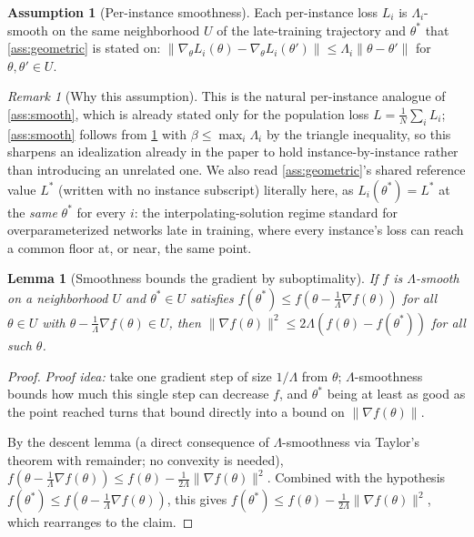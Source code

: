 \documentclass{article}
\theoremstyle{plain}
\newtheorem{lemma}[theorem]{Lemma}
\theoremstyle{definition}
\newtheorem{assumption}[theorem]{Assumption}
\theoremstyle{remark}
\newtheorem{remark}[theorem]{Remark}
\begin{document}
\begin{assumption}[Per-instance smoothness]
\label{ass:smoothi}
Each per-instance loss $L_i$ is $\Lambda_i$-smooth on the same neighborhood $U$ of the late-training trajectory and $\theta^*$ that \cref{ass:geometric} is stated on: $\|\nabla_\theta L_i(\theta)-\nabla_\theta L_i(\theta')\|\le\Lambda_i\|\theta-\theta'\|$ for $\theta,\theta'\in U$.
\end{assumption}

\begin{remark}[Why this assumption]
\label{rem:smoothi-why}
This is the natural per-instance analogue of \cref{ass:smooth}, which is already stated only for the population loss $L=\frac1N\sum_i L_i$; \cref{ass:smooth} follows from \cref{ass:smoothi} with $\beta\le\max_i\Lambda_i$ by the triangle inequality, so this sharpens an idealization already in the paper to hold instance-by-instance rather than introducing an unrelated one. We also read \cref{ass:geometric}'s shared reference value $L^*$ (written with no instance subscript) literally here, as $L_i(\theta^*)=L^*$ at the \emph{same} $\theta^*$ for every $i$: the interpolating-solution regime standard for overparameterized networks late in training, where every instance's loss can reach a common floor at, or near, the same point.
\end{remark}

\begin{lemma}[Smoothness bounds the gradient by suboptimality]
\label{lem:descent}
If $f$ is $\Lambda$-smooth on a neighborhood $U$ and $\theta^*\in U$ satisfies $f(\theta^*)\le f(\theta-\tfrac1\Lambda\nabla f(\theta))$ for all $\theta\in U$ with $\theta-\tfrac1\Lambda\nabla f(\theta)\in U$, then $\|\nabla f(\theta)\|^2 \le 2\Lambda(f(\theta)-f(\theta^*))$ for all such $\theta$.
\end{lemma}
\begin{proof}
\emph{Proof idea:} take one gradient step of size $1/\Lambda$ from $\theta$; $\Lambda$-smoothness bounds how much this single step can decrease $f$, and $\theta^*$ being at least as good as the point reached turns that bound directly into a bound on $\|\nabla f(\theta)\|$.

By the descent lemma (a direct consequence of $\Lambda$-smoothness via Taylor's theorem with remainder; no convexity is needed), $f(\theta-\tfrac1\Lambda\nabla f(\theta)) \le f(\theta) - \tfrac1{2\Lambda}\|\nabla f(\theta)\|^2$. Combined with the hypothesis $f(\theta^*)\le f(\theta-\tfrac1\Lambda\nabla f(\theta))$, this gives $f(\theta^*) \le f(\theta)-\tfrac1{2\Lambda}\|\nabla f(\theta)\|^2$, which rearranges to the claim.
\end{proof}
\end{document}
